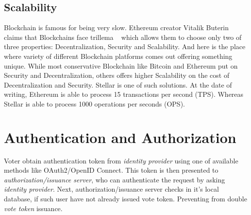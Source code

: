 \documentclass[runningheads]{llncs}
\begin{document}
\subsection{Scalability}

Blockchain is famous for being very slow. Ethereum creator Vitalik Buterin claims that Blockchains face trillema ~\cite{ethereum} which allows them to choose only two of three properties: Decentralization, Security and Scalability. And here is the place where variety of different Blockchain platforms comes out offering something unique. While most conservative Blockchain like Bitcoin and Ethereum put on Security and Decentralization, others offers higher Scalability on the cost of Decentralization and Security. Stellar is one of such solutions. 
At the date of writing, Ethereum is able to process 15 transactions per second (TPS). Whereas Stellar is able to process 1000 operations per seconds (OPS). 

\section{Authentication and Authorization}
Voter obtain authentication token from \textit{identity provider} using one of available methods like OAuth2/OpenID Connect. This token is then presented to \textit{authorization/issuance server}, who can authenticate the request by asking \textit{identity provider}. Next, authorization/issuance server checks in it's local database, if such user have not already issued vote token. Preventing from double \textit{vote token} issuance.
\end{document}
